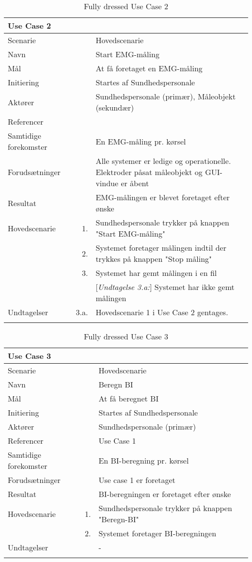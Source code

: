 \documentclass[main.tex]{subfiles}
\begin{document}
\begin{longtabu} to  %
	{\large \textbf{Use Case 2}} && \\
	\toprule
	Scenarie 				&&	Hovedscenarie\\
	Navn 					&& 	Start EMG-måling\\
	Mål 					&& 	At få foretaget en EMG-måling\\
	Initiering 				&& 	Startes af Sundhedspersonale\\
	Aktører 				&& 	Sundhedspersonale (primær), Måleobjekt (sekundær)\\
	Referencer 				&& 	\\
	Samtidige forekomster  	&& 	En EMG-måling pr. kørsel \\
	Forudsætninger 			&&	Alle systemer er ledige og operationelle. Elektroder påsat måleobjekt og GUI-vindue er åbent\\ 
	Resultat 				&& 	EMG-målingen er blevet foretaget efter ønske\\ \midrule
	Hovedscenarie 			&    1. 	&	Sundhedspersonale trykker på knappen "Start EMG-måling"\\ 				 	
							&    2. 	& 	Systemet foretager målingen indtil der trykkes på knappen "Stop måling" \\[-1ex]
							& 	 3.		&	 Systemet har gemt målingen i en fil \\[-1ex]
                            &&[\textit{Undtagelse 3.a:}] Systemet har ikke gemt målingen\\ \midrule
	Undtagelser 			& 3.a. & Hovedscenarie 1 i Use Case 2 gentages.\\ \bottomrule
	\caption{Fully dressed Use Case 2}
	\label{UC2}
\end{longtabu}

\begin{longtabu} to  %
	{\large \textbf{Use Case 3}} && \\
	\toprule
	Scenarie 				&&	Hovedscenarie\\
	Navn 					&& 	Beregn BI\\
	Mål 					&& 	At få beregnet BI\\
	Initiering 				&& 	Startes af Sundhedspersonale\\
	Aktører 				&& 	Sundhedspersonale (primær)\\
	Referencer 				&& 	Use Case 1\\
	Samtidige forekomster  	&& 	En BI-beregning pr. kørsel \\
	Forudsætninger 			&&	Use case 1 er foretaget\\ 
	Resultat 				&& 	BI-beregningen er foretaget efter ønske\\ \midrule
	Hovedscenarie 			&    1. 	&	Sundhedspersonale trykker på knappen "Beregn-BI"\\	
							&    2. 	& 	Systemet foretager BI-beregningen\\ 
Undtagelser 			&			& 	-  \\ \bottomrule
	
	\caption{Fully dressed Use Case 3}
	\label{UC3}
\end{longtabu}
\end{document}
